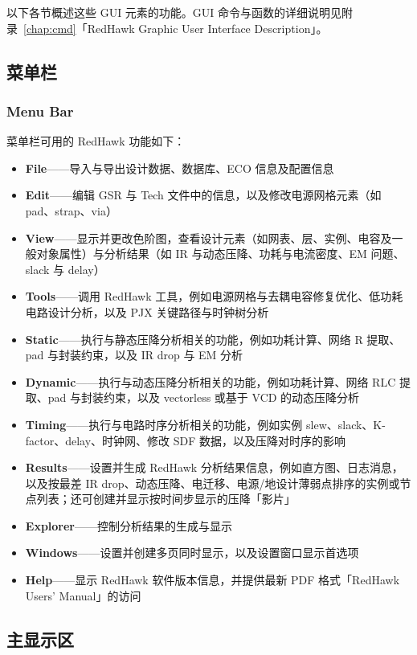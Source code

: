 以下各节概述这些 GUI 元素的功能。GUI 命令与函数的详细说明见附录~\ref{chap:cmd}「RedHawk Graphic User Interface Description」。

\label{fig:rh-gui}

\subsection{菜单栏}
\subsubsection*{Menu Bar}

菜单栏可用的 RedHawk 功能如下：
\begin{itemize}
  \item \textbf{File}——导入与导出设计数据、数据库、ECO 信息及配置信息
  \item \textbf{Edit}——编辑 GSR 与 Tech 文件中的信息，以及修改电源网格元素（如 pad、strap、via）
  \item \textbf{View}——显示并更改色阶图，查看设计元素（如网表、层、实例、电容及一般对象属性）与分析结果（如 IR 与动态压降、功耗与电流密度、EM 问题、slack 与 delay）
  \item \textbf{Tools}——调用 RedHawk 工具，例如电源网格与去耦电容修复优化、低功耗电路设计分析，以及 PJX 关键路径与时钟树分析
  \item \textbf{Static}——执行与静态压降分析相关的功能，例如功耗计算、网络 R 提取、pad 与封装约束，以及 IR drop 与 EM 分析
  \item \textbf{Dynamic}——执行与动态压降分析相关的功能，例如功耗计算、网络 RLC 提取、pad 与封装约束，以及 vectorless 或基于 VCD 的动态压降分析
  \item \textbf{Timing}——执行与电路时序分析相关的功能，例如实例 slew、slack、K-factor、delay、时钟网、修改 SDF 数据，以及压降对时序的影响
  \item \textbf{Results}——设置并生成 RedHawk 分析结果信息，例如直方图、日志消息，以及按最差 IR drop、动态压降、电迁移、电源/地设计薄弱点排序的实例或节点列表；还可创建并显示按时间步显示的压降「影片」
  \item \textbf{Explorer}——控制分析结果的生成与显示
  \item \textbf{Windows}——设置并创建多页同时显示，以及设置窗口显示首选项
  \item \textbf{Help}——显示 RedHawk 软件版本信息，并提供最新 PDF 格式「RedHawk Users' Manual」的访问
\end{itemize}

\subsection{主显示区}
